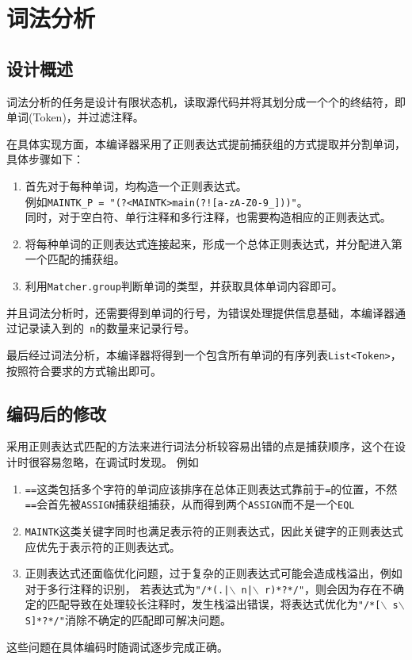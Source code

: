 \chapter{词法分析}
\section{设计概述}
    词法分析的任务是设计有限状态机，读取源代码并将其划分成一个个的终结符，即单词(Token)，并过滤注释。

    在具体实现方面，本编译器采用了正则表达式提前捕获组的方式提取并分割单词，具体步骤如下：
    \begin{enumerate}
        \item 首先对于每种单词，均构造一个正则表达式。\\例如\texttt{MAINTK\_P = "(?<MAINTK>main(?![a-zA-Z0-9\_]))"}。
            \\同时，对于空白符、单行注释和多行注释，也需要构造相应的正则表达式。
        \item 将每种单词的正则表达式连接起来，形成一个总体正则表达式，并分配进入第一个匹配的捕获组。
        \item 利用\texttt{Matcher.group}判断单词的类型，并获取具体单词内容即可。
    \end{enumerate}
    
    并且词法分析时，还需要得到单词的行号，为错误处理提供信息基础，本编译器通过记录读入到的\texttt{\ n}的数量来记录行号。

    最后经过词法分析，本编译器将得到一个包含所有单词的有序列表\texttt{List<Token>}，按照符合要求的方式输出即可。
\section{编码后的修改}
    采用正则表达式匹配的方法来进行词法分析较容易出错的点是捕获顺序，这个在设计时很容易忽略，在调试时发现。
    例如
    \begin{enumerate}
        \item \texttt{==}这类包括多个字符的单词应该排序在总体正则表达式靠前于\texttt{=}的位置，不然\texttt{==}会首先被\texttt{ASSIGN}捕获组捕获，从而得到两个\texttt{ASSIGN}而不是一个\texttt{EQL}
        \item \texttt{MAINTK}这类关键字同时也满足表示符的正则表达式，因此关键字的正则表达式应优先于表示符的正则表达式。
        \item 正则表达式还面临优化问题，过于复杂的正则表达式可能会造成栈溢出，例如对于多行注释的识别，
        若表达式为\texttt{"/*(.|$\backslash$ n|$\backslash$ r)*?*/"}，则会因为存在不确定的匹配导致在处理较长注释时，发生栈溢出错误，将表达式优化为\texttt{"/*[$\backslash$ s$\backslash$ S]*?*/"}消除不确定的匹配即可解决问题。
    \end{enumerate}
    
    这些问题在具体编码时随调试逐步完成正确。